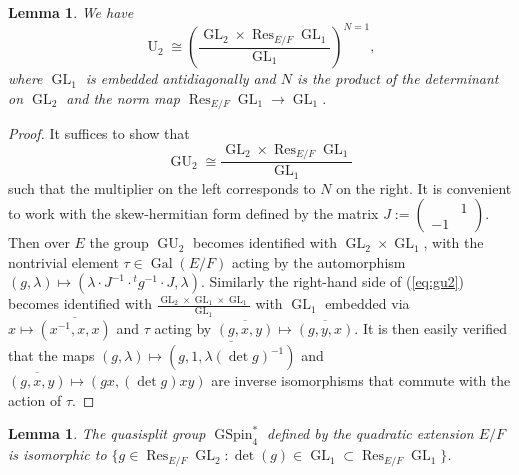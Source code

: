 \documentclass[a4paper]{amsart}
\numberwithin{equation}{section}
\newtheorem{lem}[thm]{Lemma}
\theoremstyle{remark}
\theoremstyle{definition}
\DeclareMathOperator{\Res}{Res}
\DeclareMathOperator{\Gal}{Gal}
\DeclareMathOperator{\U}{U}
\DeclareMathOperator{\GU}{GU}
\DeclareMathOperator{\GSpin}{GSpin}
\DeclareMathOperator{\GL}{GL}
\begin{document}
\begin{lem}\label{lm:u2}
  We have
  \begin{equation*}
    \U_2 \cong \left(\frac{\GL_2 \times \Res_{E/F} \GL_1}{\GL_1}\right)^{N=1},
  \end{equation*}
  where $\GL_1$ is embedded antidiagonally and $N$ is the product of the determinant on $\GL_2$ and the norm map $\Res_{E/F} \GL_1 \to \GL_1$.
\end{lem}

\begin{proof}
  It suffices to show that
  \begin{equation}\label{eq:gu2}
    \GU_2 \cong \frac{\GL_2 \times \Res_{E/F} \GL_1}{\GL_1}
  \end{equation}
  such that the multiplier on the left corresponds to $N$ on the right.
  It is convenient to work with the skew-hermitian form defined by the matrix $J := (\begin{smallmatrix}&1 \\ -1&\end{smallmatrix})$.
  Then over $E$ the group $\GU_2$ becomes identified with $\GL_2 \times \GL_1$, with the nontrivial element $\tau \in \Gal(E/F)$ acting by the 
  automorphism $(g,\lambda) \mapsto (\lambda \cdot J^{-1} \cdot {}^t g^{-1} \cdot J,\lambda)$.
  Similarly the right-hand side of (\ref{eq:gu2}) becomes identified with $\frac{\GL_2 \times \GL_1 \times \GL_1}{\GL_1}$ with $\GL_1$ embedded
  via $x \mapsto \overline{(x^{-1},x,x)}$ and $\tau$ acting by $\overline{(g,x,y)} \mapsto \overline{(g,y,x)}$.
  It is then easily verified that the maps $(g,\lambda) \mapsto \overline{(g,1,\lambda(\det g)^{-1})}$ and $\overline{(g,x,y)} \mapsto (gx,(\det g)xy)$
  are inverse isomorphisms that commute with the action of $\tau$.
\end{proof}

\begin{lem}\label{lm:gspin4}
  The quasisplit group $\GSpin_4^*$ defined by the quadratic extension $E/F$ is isomorphic to
  $\{g \in \Res_{E/F} \GL_2 : \det(g) \in \GL_1 \subset \Res_{E/F} \GL_1 \}$.
\end{lem}
\end{document}
